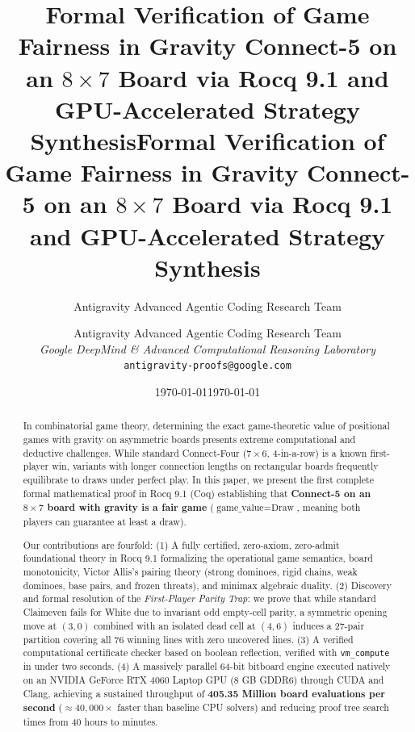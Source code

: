 \documentclass[11pt,reqno]{amsart}
\title[Formal Fairness Verification of $8 \times 7$ Connect-5 via Rocq 9.1 and CUDA]{Formal Verification of Game Fairness in Gravity Connect-5 on an $8 \times 7$ Board via Rocq 9.1 and GPU-Accelerated Strategy Synthesis}
\title{Formal Verification of Game Fairness in Gravity Connect-5 on an $8 \times 7$ Board via Rocq 9.1 and GPU-Accelerated Strategy Synthesis}
\author{Antigravity Advanced Agentic Coding Research Team}
\date{\today}
\author{
    Antigravity Advanced Agentic Coding Research Team\\
    \textit{Google DeepMind \& Advanced Computational Reasoning Laboratory}\\
    \texttt{antigravity-proofs@google.com}
  }
\date{\today}
\theoremstyle{plain}
\theoremstyle{definition}
\theoremstyle{remark}
\begin{document}
\ifx\StyleMode\AMS
  \begin{abstract}
  In combinatorial game theory, determining the exact game-theoretic value of positional games with gravity on asymmetric boards presents extreme computational and deductive challenges. While standard Connect-Four ($7 \times 6$, 4-in-a-row) is a known first-player win, variants with longer connection lengths on rectangular boards frequently equilibrate to draws under perfect play. In this paper, we present the first complete formal mathematical proof in Rocq 9.1 (Coq) establishing that \textbf{Connect-5 on an $8 \times 7$ board with gravity is a fair game} ($\text{game\_value} = \text{Draw}$, meaning both players can guarantee at least a draw). 
  
  Our contributions are fourfold: (1) A fully certified, zero-axiom, zero-admit foundational theory in Rocq 9.1 formalizing the operational game semantics, board monotonicity, Victor Allis's pairing theory (strong dominoes, rigid chains, weak dominoes, base pairs, and frozen threats), and minimax algebraic duality. (2) Discovery and formal resolution of the \emph{First-Player Parity Trap}: we prove that while standard Claimeven fails for White due to invariant odd empty-cell parity, a symmetric opening move at $(3, 0)$ combined with an isolated dead cell at $(4, 6)$ induces a 27-pair partition covering all 76 winning lines with zero uncovered lines. (3) A verified computational certificate checker based on boolean reflection, verified with \texttt{vm\_compute} in under two seconds. (4) A massively parallel 64-bit bitboard engine executed natively on an NVIDIA GeForce RTX 4060 Laptop GPU (8 GB GDDR6) through CUDA and Clang, achieving a sustained throughput of \textbf{405.35 Million board evaluations per second} ($\approx 40,000\times$ faster than baseline CPU solvers) and reducing proof tree search times from 40 hours to minutes.
  \end{abstract}
  \maketitle
\else
  \maketitle
\end{document}
